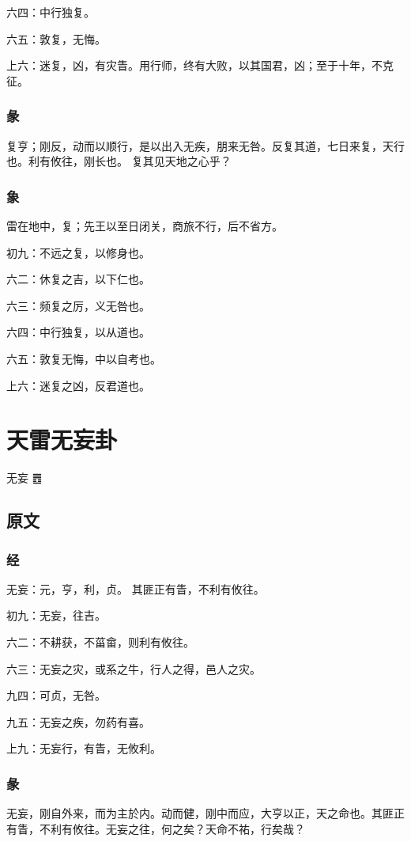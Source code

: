 \documentclass[12pt,oneside]{book}
\begin{document}
六四：中行独复。

六五：敦复，无悔。

上六：迷复，凶，有灾眚。用行师，终有大败，以其国君，凶；至于十年，不克征。

\subsection{彖}
复亨；刚反，动而以顺行，是以出入无疾，朋来无咎。反复其道，七日来复，天行也。利有攸往，刚长也。 复其见天地之心乎？

\subsection{象}
雷在地中，复；先王以至日闭关，商旅不行，后不省方。

初九：不远之复，以修身也。

六二：休复之吉，以下仁也。

六三：频复之厉，义无咎也。

六四：中行独复，以从道也。

六五：敦复无悔，中以自考也。

上六：迷复之凶，反君道也。

\chapter{天雷无妄卦}
无妄 {\Large ䷘}

\section{原文}
\subsection{经}
无妄：元，亨，利，贞。 其匪正有眚，不利有攸往。

初九：无妄，往吉。

六二：不耕获，不菑畲，则利有攸往。

六三：无妄之灾，或系之牛，行人之得，邑人之灾。

九四：可贞，无咎。

九五：无妄之疾，勿药有喜。

上九：无妄行，有眚，无攸利。

\subsection{彖}
无妄，刚自外来，而为主於内。动而健，刚中而应，大亨以正，天之命也。其匪正有眚，不利有攸往。无妄之往，何之矣？天命不祐，行矣哉？
\end{document}
